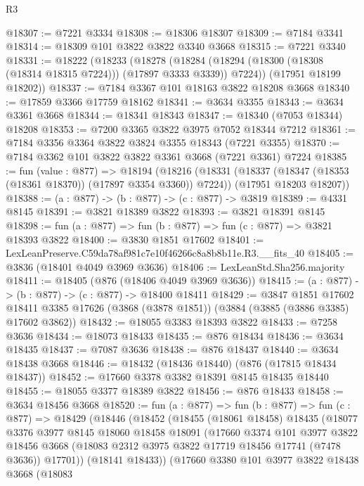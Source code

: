 \begin{lexlean}{R3}
\begin{coremodule}
@18307 := @7221 @3334
@18308 := @18306 @18307
@18309 := @7184 @3341
@18314 := @18309 @101 @3822 @3822 @3340 @3668
@18315 := @7221 @3340
@18331 := @18222
    (@18233
      (@18278 (@18284 (@18294 (@18300 (@18308 (@18314 @18315 @7224))) (@17897 @3333 @3339)) @7224))
      (@17951 @18199 @18202))
@18337 := @7184 @3367 @101 @18163 @3822 @18208 @3668
@18340 := @17859 @3366 @17759 @18162
@18341 := @3634 @3355
@18343 := @3634 @3361 @3668
@18344 := @18341 @18343
@18347 := @18340 (@7053 @18344) @18208
@18353 := @7200 @3365 @3822 @3975 @7052 @18344 @7212
@18361 := @7184 @3356 @3364 @3822 @3824 @3355 @18343 (@7221 @3355)
@18370 := @7184 @3362 @101 @3822 @3822 @3361 @3668 (@7221 @3361) @7224
@18385 := fun (value : @877) =>
  @18194
    (@18216
      (@18331 (@18337 (@18347 (@18353 (@18361 @18370)) (@17897 @3354 @3360)) @7224))
      (@17951 @18203 @18207))
@18388 := (a : @877) -> (b : @877) -> (c : @877) -> @3819
@18389 := @4331 @8145
@18391 := @3821 @18389 @3822
@18393 := @3821 @18391 @8145
@18398 := fun (a : @877) => fun (b : @877) => fun (c : @877) => @3821 @18393 @3822
@18400 := @3830 @1851 @17602
@18401 := LexLeanPreserve.C59da78af981c7e10f46266c8a8b8b11e.R3.__fits_40
@18405 := @3836 (@18401 @4049 @3969 @3636)
@18406 := LexLeanStd.Sha256.majority
@18411 := @18405 (@876 (@18406 @4049 @3969 @3636))
@18415 := (a : @877) -> (b : @877) -> (c : @877) -> @18400 @18411
@18429 := @3847
    @1851
    @17602
    @18411
    @3385
    @17626
    (@3868 (@3878 @1851))
    (@3884 (@3885 (@3886 @3385) @17602 @3862))
@18432 := @18055 @3383 @18393 @3822
@18433 := @7258 @3636
@18434 := @18073 @18433
@18435 := @876 @18434
@18436 := @3634 @18435
@18437 := @7087 @3636
@18438 := @876 @18437
@18440 := @3634 @18438 @3668
@18446 := @18432 (@18436 @18440) (@876 (@17815 @18434 @18437))
@18452 := @17660 @3378 @3382 @18391 @8145 @18435 @18440
@18455 := @18055 @3377 @18389 @3822
@18456 := @876 @18433
@18458 := @3634 @18456 @3668
@18520 := fun (a : @877) =>
  fun (b : @877) =>
  fun (c : @877) =>
  @18429
    (@18446
      (@18452
        (@18455
          (@18061 @18458)
          @18435
          (@18077
            @3376
            @3977
            @8145
            @18060
            @18458
            @18091
            (@17660
              @3374
              @101
              @3977
              @3822
              @18456
              @3668
              (@18083 @2312 @3975 @3822 @17719 @18456 @17741 (@7478 @3636))
              @17701))
          (@18141 @18433))
        (@17660
          @3380
          @101
          @3977
          @3822
          @18438
          @3668
          (@18083

\end{coremodule}
\end{lexlean}

